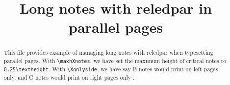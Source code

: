 \documentclass{article}
\begin{document}
\date{}
\begin{english}
\title{Long notes with reledpar in parallel pages}
\maketitle
\begin{abstract}
This file provides example of managing long notes with reledpar when typesetting parallel pages.
With \verb+\maxhXnotes+, we have set the maximum height of critical notes to \verb+0.25\textheight+. With \verb+\Xonlyside+, we have say B notes would  print  on left pages only, and C notes would  print on right pages only .
\end{abstract}

\end{english}
\end{document}
